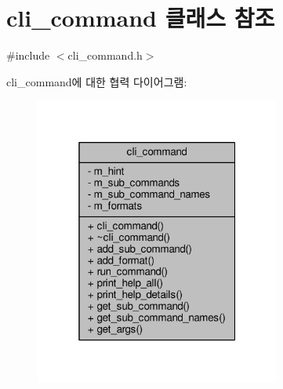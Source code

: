 \hypertarget{classcli__command}{}\section{cli\+\_\+command 클래스 참조}
\label{classcli__command}


{\ttfamily \#include $<$cli\+\_\+command.\+h$>$}



cli\+\_\+command에 대한 협력 다이어그램\+:
\nopagebreak
\begin{figure}[H]
\begin{center}
\leavevmode
\includegraphics[width=229pt]{classcli__command__coll__graph}
\end{center}
\end{figure}
